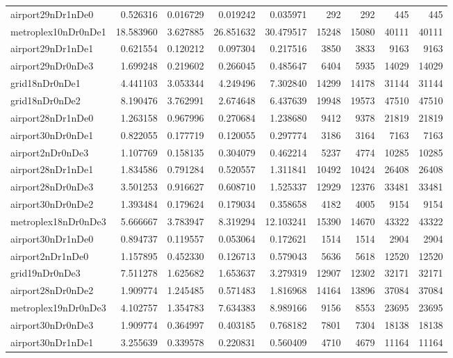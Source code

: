 \begin{longtable}{|l|r|r|r|r|r|r|r|r|}
airport29nDr1nDe0 & 0.526316 & 0.016729 & 0.019242 & 0.035971 & 292 & 292 & 445 & 445 \\
metroplex10nDr0nDe1 & 18.583960 & 3.627885 & 26.851632 & 30.479517 & 15248 & 15080 & 40111 & 40111 \\
airport29nDr1nDe1 & 0.621554 & 0.120212 & 0.097304 & 0.217516 & 3850 & 3833 & 9163 & 9163 \\
airport29nDr0nDe3 & 1.699248 & 0.219602 & 0.266045 & 0.485647 & 6404 & 5935 & 14029 & 14029 \\
grid18nDr0nDe1 & 4.441103 & 3.053344 & 4.249496 & 7.302840 & 14299 & 14178 & 31144 & 31144 \\
grid18nDr0nDe2 & 8.190476 & 3.762991 & 2.674648 & 6.437639 & 19948 & 19573 & 47510 & 47510 \\
airport28nDr1nDe0 & 1.263158 & 0.967996 & 0.270684 & 1.238680 & 9412 & 9378 & 21819 & 21819 \\
airport30nDr0nDe1 & 0.822055 & 0.177719 & 0.120055 & 0.297774 & 3186 & 3164 & 7163 & 7163 \\
airport2nDr0nDe3 & 1.107769 & 0.158135 & 0.304079 & 0.462214 & 5237 & 4774 & 10285 & 10285 \\
airport28nDr1nDe1 & 1.834586 & 0.791284 & 0.520557 & 1.311841 & 10492 & 10424 & 26408 & 26408 \\
airport28nDr0nDe3 & 3.501253 & 0.916627 & 0.608710 & 1.525337 & 12929 & 12376 & 33481 & 33481 \\
airport30nDr0nDe2 & 1.393484 & 0.179624 & 0.179034 & 0.358658 & 4182 & 4005 & 9154 & 9154 \\
metroplex18nDr0nDe3 & 5.666667 & 3.783947 & 8.319294 & 12.103241 & 15390 & 14670 & 43322 & 43322 \\
airport30nDr1nDe0 & 0.894737 & 0.119557 & 0.053064 & 0.172621 & 1514 & 1514 & 2904 & 2904 \\
airport2nDr1nDe0 & 1.157895 & 0.452330 & 0.126713 & 0.579043 & 5636 & 5618 & 12520 & 12520 \\
grid19nDr0nDe3 & 7.511278 & 1.625682 & 1.653637 & 3.279319 & 12907 & 12302 & 32171 & 32171 \\
airport28nDr0nDe2 & 1.909774 & 1.245485 & 0.571483 & 1.816968 & 14164 & 13896 & 37084 & 37084 \\
metroplex19nDr0nDe3 & 4.102757 & 1.354783 & 7.634383 & 8.989166 & 9156 & 8553 & 23695 & 23695 \\
airport30nDr0nDe3 & 1.909774 & 0.364997 & 0.403185 & 0.768182 & 7801 & 7304 & 18138 & 18138 \\
airport30nDr1nDe1 & 3.255639 & 0.339578 & 0.220831 & 0.560409 & 4710 & 4679 & 11164 & 11164 \\

\end{longtable}
